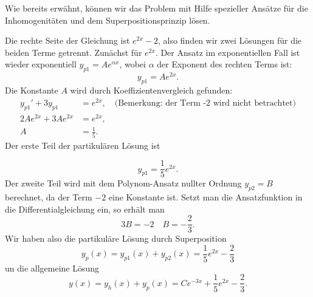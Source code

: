 {\begin{itemize}
\begin{iii}
Wie bereits erwähnt, können wir das Problem mit Hilfe spezieller Ansätze für die Inhomogenitäten und dem Superpositionsprinzip lösen.

Die rechte Seite der Gleichung ist $e^{2x} -2$, also finden wir zwei Lösungen für die beiden Terme getrennt. Zunächst für $e^{2x}$. Der Ansatz im exponentiellen Fall ist wieder exponentiell $y_{p1}=Ae^{\alpha x}$, wobei $\alpha$ der Exponent des rechten Terms ist:
$$
y_{p1} = A e^{2x}.
$$
Die Konstante $A$ wird durch Koeffizientenvergleich gefunden:
\begin{align*}
y_{p1}' +3y_{p1} &= e^{2x}, \quad \text{(Bemerkung: der Term -2 wird nicht betrachtet)}\\
2 A e^{2x} + 3 A e^{2x} &= e^{2x},\\
A &= \frac{1}{5}.
\end{align*}
Der erste Teil der partikulären Lösung ist

$$
y_{p1} = \frac{1}{5}e^{2x}.
$$
Der zweite Teil wird mit dem Polynom-Ansatz nullter Ordnung $y_{p2}=B$ berechnet, da der Term $-2$ eine Konstante ist. Setzt man die Ansatzfunktion in die Differentialgleichung ein, so erhält man
$$
3 B = -2 \quad B=-\frac{2}{3}.
$$
Wir haben also die partikuläre Lösung durch Superposition
$$
y_p(x) = y_{p1}(x) + y_{p2}(x) =  \frac{1}{5}e^{2x} - \frac{2}{3}
$$
un die allgemeine Lösung
$$
y(x) = y_h(x) + y_p(x) = Ce^{-3x} +  \frac{1}{5}e^{2x} - \frac{2}{3}.
$$
\end{iii}

\end{itemize}
}




